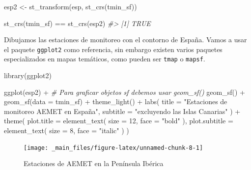 \documentclass[
]{report}
\newenvironment{Shaded}{\begin{snugshade}}{\end{snugshade}}
\newcommand{\AttributeTok}[1]{\textcolor[rgb]{0.77,0.63,0.00}{#1}}
\newcommand{\CommentTok}[1]{\textcolor[rgb]{0.56,0.35,0.01}{\textit{#1}}}
\newcommand{\DecValTok}[1]{\textcolor[rgb]{0.00,0.00,0.81}{#1}}
\newcommand{\FunctionTok}[1]{\textcolor[rgb]{0.00,0.00,0.00}{#1}}
\newcommand{\NormalTok}[1]{#1}
\newcommand{\OtherTok}[1]{\textcolor[rgb]{0.56,0.35,0.01}{#1}}
\newcommand{\SpecialCharTok}[1]{\textcolor[rgb]{0.00,0.00,0.00}{#1}}
\newcommand{\StringTok}[1]{\textcolor[rgb]{0.31,0.60,0.02}{#1}}
\theoremstyle{definition}
\theoremstyle{definition}
\theoremstyle{definition}
\theoremstyle{definition}
\theoremstyle{remark}
\begin{document}
\begin{Shaded}
\begin{Highlighting}[]
\NormalTok{esp2 }\OtherTok{\textless{}{-}} \FunctionTok{st\_transform}\NormalTok{(esp, }\FunctionTok{st\_crs}\NormalTok{(tmin\_sf))}

\FunctionTok{st\_crs}\NormalTok{(tmin\_sf) }\SpecialCharTok{==} \FunctionTok{st\_crs}\NormalTok{(esp2)}
\CommentTok{\#\textgreater{} [1] TRUE}
\end{Highlighting}
\end{Shaded}

Dibujamos las estaciones de monitoreo con el contorno de España. Vamos a usar el
paquete \texttt{ggplot2} como referencia, sin embargo existen varios paquetes
especializados en mapas temáticos, como pueden ser \texttt{tmap} o \texttt{mapsf}.

\begin{Shaded}
\begin{Highlighting}[]
\FunctionTok{library}\NormalTok{(ggplot2)}

\FunctionTok{ggplot}\NormalTok{(esp2) }\SpecialCharTok{+}
  \CommentTok{\# Para graficar objetos sf debemos usar geom\_sf()}
  \FunctionTok{geom\_sf}\NormalTok{() }\SpecialCharTok{+}
  \FunctionTok{geom\_sf}\NormalTok{(}\AttributeTok{data =}\NormalTok{ tmin\_sf) }\SpecialCharTok{+}
  \FunctionTok{theme\_light}\NormalTok{() }\SpecialCharTok{+}
  \FunctionTok{labs}\NormalTok{(}
    \AttributeTok{title =} \StringTok{"Estaciones de monitoreo AEMET en  España"}\NormalTok{,}
    \AttributeTok{subtitle =} \StringTok{"excluyendo las Islas Canarias"}
\NormalTok{  ) }\SpecialCharTok{+}
  \FunctionTok{theme}\NormalTok{(}
    \AttributeTok{plot.title =} \FunctionTok{element\_text}\NormalTok{(}
      \AttributeTok{size =} \DecValTok{12}\NormalTok{,}
      \AttributeTok{face =} \StringTok{"bold"}
\NormalTok{    ),}
    \AttributeTok{plot.subtitle =} \FunctionTok{element\_text}\NormalTok{(}
      \AttributeTok{size =} \DecValTok{8}\NormalTok{,}
      \AttributeTok{face =} \StringTok{"italic"}
\NormalTok{    )}
\NormalTok{  )}
\end{Highlighting}
\end{Shaded}

\begin{figure}

{\centering \texttt{[image: \_main\_files/figure-latex/unnamed-chunk-8-1]} 

}

\caption{Estaciones de AEMET en la Península Ibérica}\label{fig:unnamed-chunk-8}
\end{figure}
\end{document}
